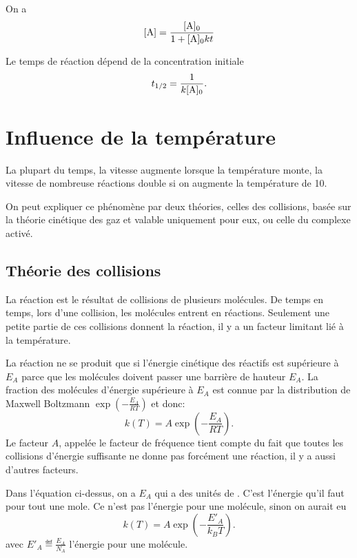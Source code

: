 On a
\[ [\ce{A}] = \frac{[\ce{A}]_0}{1+[\ce{A}]_0kt}\]

Le temps de réaction dépend de la concentration initiale
\[ t_{1/2} = \frac 1{k[\ce{A}]_0}. \]

\section{Influence de la température}
La plupart du temps, la vitesse augmente lorsque la température monte,
la vitesse de nombreuse réactions double si on augmente
la température de \si{10}{\celsius}.

On peut expliquer ce phénomène par deux théories,
celles des collisions, basée sur la théorie cinétique des gaz et
valable uniquement pour eux, ou celle du complexe activé.

\subsection{Théorie des collisions}
La réaction est le résultat de collisions de plusieurs molécules.
De temps en temps, lors d'une collision, les molécules entrent en réactions.
Seulement une petite partie de ces collisions donnent la réaction,
il y a un facteur limitant lié à la température.

La réaction ne se produit que si l'énergie cinétique des réactifs est
supérieure à $E_A$ parce que les molécules
doivent passer une barrière de hauteur $E_A$.
La fraction des molécules d'énergie supérieure à
$E_A$ est connue par la distribution de Maxwell Boltzmann
$\exp \left(-\frac{E_A}{RT}\right)$ et donc:
\begin{equation}
  \label{eq:kART}
  k(T) = A \exp \left(-\frac{E_A}{RT}\right).
\end{equation}
Le facteur $A$, appelée le facteur de fréquence tient compte du fait
que toutes les collisions d'énergie suffisante ne donne pas
forcément une réaction, il y a aussi d'autres facteurs.

\begin{myrem}
  Dans l'équation ci-dessus, on a $E_A$ qui a des unités de \joule\per\mole.
  C'est l'énergie qu'il faut pour tout une mole.
  Ce n'est pas l'énergie pour une molécule,
  sinon on aurait eu
  \[ k(T) = A \exp \left(-\frac{E'_A}{k_BT}\right). \]
  avec $E'_A \eqdef \frac{E_A}{N_A}$ l'énergie pour une molécule.
\end{myrem}

